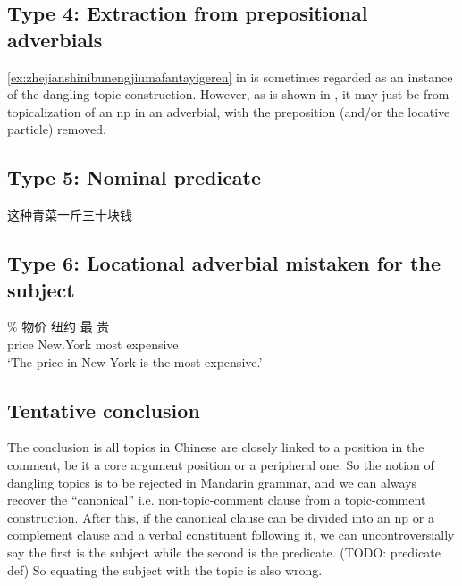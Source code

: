 \documentclass[UTF8, a4paper, oneside, scheme=plain, 12pt]{ctexrep}
\newcommand{\translate}[1]{`#1'}
\begin{document}
\subsection{Type 4: Extraction from prepositional adverbials}

\eqref{ex:zhejianshinibunengjiumafantayigeren} in  
is sometimes regarded as an instance of the dangling topic construction.
However, as is shown in ,
it may just be from topicalization of an \acs{np} in an adverbial,
with the preposition (and/or the locative particle) removed.

\subsection{Type 5: Nominal predicate}

\begin{exe}
    \ex 这种青菜一斤三十块钱
\end{exe}

\subsection{Type 6: Locational adverbial mistaken for the subject}

\begin{exe}
    \ex \gll \% 物价 纽约 最 贵  \\
    {} price New.York most expensive \\
    \glt \translate{The price in New York is the most expensive.}
\end{exe}

\subsection{Tentative conclusion}

The conclusion is all topics in Chinese are closely linked to a position in the comment,
be it a core argument position or a peripheral one.
So the notion of dangling topics is to be rejected in Mandarin grammar,
and we can always recover the ``canonical'' i.e. non-topic-comment clause
from a topic-comment construction.
After this, if the canonical clause can be divided into an \acs{np}
or a complement clause and a verbal constituent following it,
we can uncontroversially say the first is the subject while the second is the predicate. (TODO: predicate def)
So equating the subject with the topic is also wrong.
\end{document}
